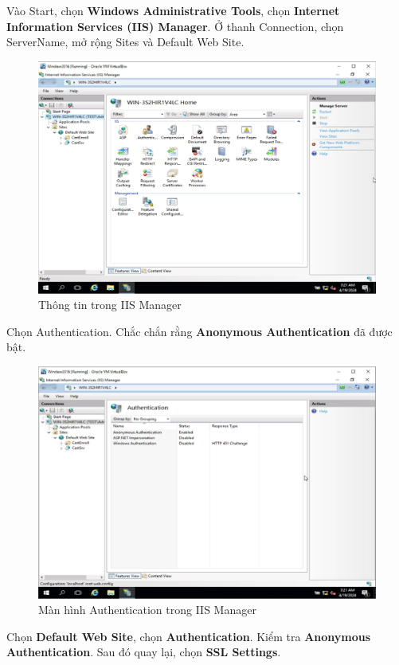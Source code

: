 Vào Start, chọn \textbf{Windows Administrative Tools}, chọn \textbf{Internet Information Services (IIS) Manager}. Ở thanh Connection, chọn ServerName, mở rộng Sites và Default Web Site.

\begin{figure}[!htb]
    \centering
    \includegraphics[width=0.9\linewidth]{figure//chapter4//lab4_2/iis_manager.png}
    \caption{Thông tin trong IIS Manager}
    \label{fig:enter-label}
\end{figure}

 Chọn Authentication. Chắc chắn rằng \textbf{Anonymous Authentication} đã được bật.

\begin{figure}[!htb]
    \centering
    \includegraphics[width=0.8\linewidth]{figure//chapter4//lab4_2/iis_auth.png}
    \caption{Màn hình Authentication trong IIS Manager}
    \label{fig:enter-label}
\end{figure}

\newpage
{} Chọn \textbf{Default Web Site}, chọn \textbf{Authentication}. Kiểm tra \textbf{Anonymous Authentication}. Sau đó quay lại, chọn \textbf{SSL Settings}.

